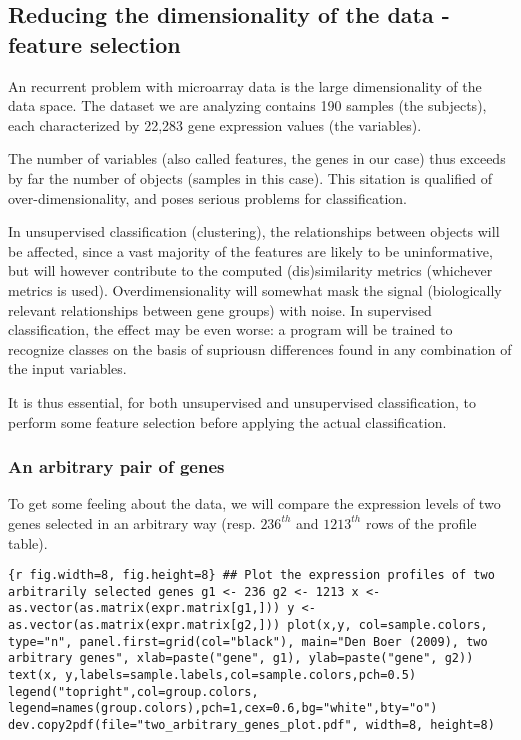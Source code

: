 \subsection{Reducing the dimensionality of the data - feature
selection}\label{reducing-the-dimensionality-of-the-data---feature-selection}

An recurrent problem with microarray data is the large dimensionality of
the data space. The dataset we are analyzing contains 190 samples (the
{subjects}), each characterized by 22,283 gene expression values (the
{variables}).

The number of variables (also called {features}, the genes in our case)
thus exceeds by far the number of objects (samples in this case). This
sitation is qualified of {over-dimensionality}, and poses serious
problems for classification.

In unsupervised classification (clustering), the relationships between
objects will be affected, since a vast majority of the features are
likely to be uninformative, but will however contribute to the computed
(dis)similarity metrics (whichever metrics is used). Overdimensionality
will somewhat mask the signal (biologically relevant relationships
between gene groups) with noise. In supervised classification, the
effect may be even worse: a program will be trained to recognize classes
on the basis of supriousn differences found in any combination of the
input variables.

It is thus essential, for both unsupervised and unsupervised
classification, to perform some {feature selection} before applying the
actual classification.

\subsubsection{An arbitrary pair of
genes}\label{an-arbitrary-pair-of-genes}

To get some feeling about the data, we will compare the expression
levels of two genes selected in an arbitrary way (resp. $236^{th}$ and
$1213^{th}$ rows of the profile table).

\texttt{\{r fig.width=8, fig.height=8\} \#\# Plot the expression profiles of two arbitrarily selected genes g1 \textless{}- 236 g2 \textless{}- 1213 x \textless{}- as.vector(as.matrix(expr.matrix{[}g1,{]})) y \textless{}- as.vector(as.matrix(expr.matrix{[}g2,{]})) plot(x,y,        col=sample.colors,        type="n",        panel.first=grid(col="black"),             main="Den Boer (2009), two arbitrary genes",        xlab=paste("gene", g1), ylab=paste("gene", g2)) text(x, y,labels=sample.labels,col=sample.colors,pch=0.5) legend("topright",col=group.colors,           legend=names(group.colors),pch=1,cex=0.6,bg="white",bty="o") dev.copy2pdf(file="two\_arbitrary\_genes\_plot.pdf", width=8, height=8)}

